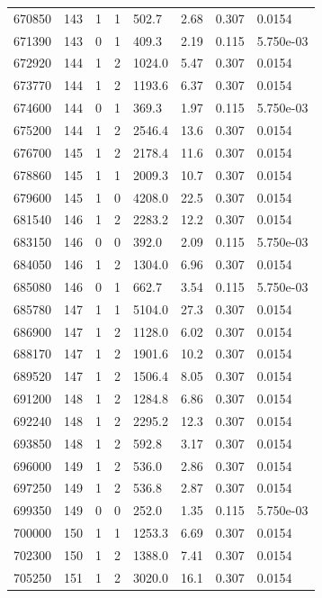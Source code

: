 \documentclass[preview]{standalone}
\begin{document}
{{{{{{{{{{{{{{{{\begin{tabular}{L{1.2cm}C{1.2cm} C{0.3cm}C{0.5cm} C{1.4cm}C{1.4cm} C{1.4cm}C{1.4cm}}
  670850  &   143  & 1     &  1 &  502.7  & 2.68  & 0.307 &  0.0154   \\ 
  671390  &   143  & 0     &  1 &  409.3  & 2.19  & 0.115 &  5.750e-03   \\ 
  672920  &   144  & 1     &  2 &  1024.0  & 5.47  & 0.307 &  0.0154   \\ 
  673770  &   144  & 1     &  2 &  1193.6  & 6.37  & 0.307 &  0.0154   \\ 
  674600  &   144  & 0     &  1 &  369.3  & 1.97  & 0.115 &  5.750e-03   \\ 
  675200  &   144  & 1     &  2 &  2546.4  & 13.6  & 0.307 &  0.0154   \\ 
  676700  &   145  & 1     &  2 &  2178.4  & 11.6  & 0.307 &  0.0154   \\ 
  678860  &   145  & 1     &  1 &  2009.3  & 10.7  & 0.307 &  0.0154   \\ 
  679600  &   145  & 1     &  0 &  4208.0  & 22.5  & 0.307 &  0.0154   \\ 
  681540  &   146  & 1     &  2 &  2283.2  & 12.2  & 0.307 &  0.0154   \\ 
  683150  &   146  & 0     &  0 &  392.0  & 2.09  & 0.115 &  5.750e-03   \\ 
  684050  &   146  & 1     &  2 &  1304.0  & 6.96  & 0.307 &  0.0154   \\ 
  685080  &   146  & 0     &  1 &  662.7  & 3.54  & 0.115 &  5.750e-03   \\ 
  685780  &   147  & 1     &  1 &  5104.0  & 27.3  & 0.307 &  0.0154   \\ 
  686900  &   147  & 1     &  2 &  1128.0  & 6.02  & 0.307 &  0.0154   \\ 
  688170  &   147  & 1     &  2 &  1901.6  & 10.2  & 0.307 &  0.0154   \\ 
  689520  &   147  & 1     &  2 &  1506.4  & 8.05  & 0.307 &  0.0154   \\ 
  691200  &   148  & 1     &  2 &  1284.8  & 6.86  & 0.307 &  0.0154   \\ 
  692240  &   148  & 1     &  2 &  2295.2  & 12.3  & 0.307 &  0.0154   \\ 
  693850  &   148  & 1     &  2 &  592.8  & 3.17  & 0.307 &  0.0154   \\ 
  696000  &   149  & 1     &  2 &  536.0  & 2.86  & 0.307 &  0.0154   \\ 
  697250  &   149  & 1     &  2 &  536.8  & 2.87  & 0.307 &  0.0154   \\ 
  699350  &   149  & 0     &  0 &  252.0  & 1.35  & 0.115 &  5.750e-03   \\ 
  700000  &   150  & 1     &  1 &  1253.3  & 6.69  & 0.307 &  0.0154   \\ 
  702300  &   150  & 1     &  2 &  1388.0  & 7.41  & 0.307 &  0.0154   \\ 
  705250  &   151  & 1     &  2 &  3020.0  & 16.1  & 0.307 &  0.0154   \\ 
\hline 
\end{tabular} 

}}}}}}}}}}}}}}}}
\end{document}
